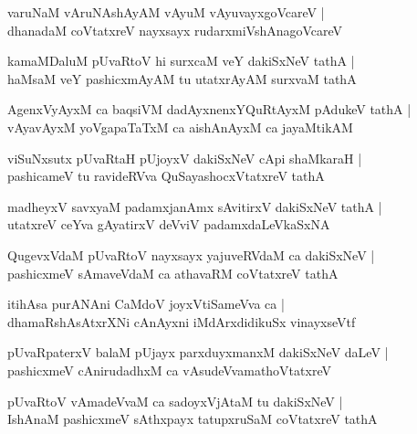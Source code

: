 \begin{shloka}
varuNaM vAruNAshAyAM vAyuM vAyuvayxgoVcareV |\\
dhanadaM coVtatxreV nayxsayx rudarxmiVshAnagoVcareV
\end{shloka}

\begin{shloka}
kamaMDaluM pUvaRtoV hi surxcaM veY dakiSxNeV tathA |\\
haMsaM veY pashicxmAyAM tu utatxrAyAM surxvaM tathA 
\end{shloka}

\begin{shloka}
AgenxVyAyxM ca baqsiVM dadAyxnenxYQuRtAyxM pAdukeV tathA |\\
vAyavAyxM yoVgapaTaTxM ca aishAnAyxM ca jayaMtikAM 
\end{shloka}

\begin{shloka}
viSuNxsutx pUvaRtaH pUjoyxV dakiSxNeV cApi shaMkaraH |\\
pashicameV tu ravideRVva QuSayashocxVtatxreV tathA
\end{shloka}

\begin{shloka}
madheyxV savxyaM padamxjanAmx sAvitirxV dakiSxNeV tathA |\\
utatxreV ceYva gAyatirxV deVviV padamxdaLeVkaSxNA 
\end{shloka}

\begin{shloka}
QugevxVdaM pUvaRtoV nayxsayx yajuveRVdaM ca dakiSxNeV |\\
pashicxmeV sAmaveVdaM ca athavaRM coVtatxreV tathA
\end{shloka}

\begin{shloka}
itihAsa purANAni CaMdoV joyxVtiSameVva ca |\\
dhamaRshAsAtxrXNi cAnAyxni iMdArxdidikuSx vinayxseVtf
\end{shloka}

\begin{shloka}
pUvaRpaterxV balaM pUjayx parxduyxmanxM dakiSxNeV daLeV |\\
pashicxmeV cAnirudadhxM ca vAsudeVvamathoVtatxreV 
\end{shloka}

\begin{shloka}
pUvaRtoV vAmadeVvaM ca sadoyxVjAtaM tu dakiSxNeV |\\
IshAnaM pashicxmeV sAthxpayx tatupxruSaM coVtatxreV tathA
\end{shloka}

